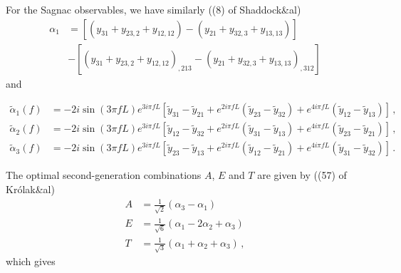\documentclass[aps,showpacs,twocolumn,prd,superscriptaddress,nofootinbib]{revtex4}
\newcommand{\nn}{\nonumber}
\begin{document}
For the Sagnac observables, we have similarly ((8) of Shaddock\&al)
%
\begin{align}
	\alpha_{1} &= \left[ \left( y_{31} + y_{23,2} + y_{12,12} \right) - \left( y_{21} + y_{32,3} + y_{13,13} \right) \right] \nn\\
	& - \left[ \left( y_{31} + y_{23,2} + y_{12,12} \right)_{,213} - \left( y_{21} + y_{32,3} + y_{13,13} \right)_{,312} \right]
\end{align}
%
and
%
\begin{widetext}
\begin{align}
	\tilde{\alpha}_{1}(f) &= - 2i \sin\left(3\pi f L\right) e^{3 i \pi f L} \left[ \tilde{y}_{31} - \tilde{y}_{21} + e^{2i\pi f L} \left( \tilde{y}_{23} - \tilde{y}_{32} \right) + e^{4i\pi f L} \left( \tilde{y}_{12} - \tilde{y}_{13} \right) \right] \,, \nn\\
	\tilde{\alpha}_{2}(f) &= - 2i \sin\left(3\pi f L\right) e^{3 i \pi f L} \left[ \tilde{y}_{12} - \tilde{y}_{32} + e^{2i\pi f L} \left( \tilde{y}_{31} - \tilde{y}_{13} \right) + e^{4i\pi f L} \left( \tilde{y}_{23} - \tilde{y}_{21} \right) \right] \,, \nn\\
	\tilde{\alpha}_{3}(f) &= - 2i \sin\left(3\pi f L\right) e^{3 i \pi f L} \left[ \tilde{y}_{23} - \tilde{y}_{13} + e^{2i\pi f L} \left( \tilde{y}_{12} - \tilde{y}_{21} \right) + e^{4i\pi f L} \left( \tilde{y}_{31} - \tilde{y}_{32} \right) \right] \,.
\end{align}
\end{widetext}
%
The optimal second-generation combinations $A$, $E$ and $T$ are given by ((57) of Kr\'olak\&al)
%
\begin{align}
	A &= \frac{1}{\sqrt{2}} \left( \alpha_{3} - \alpha_{1} \right) \nn\\
	E &= \frac{1}{\sqrt{6}} \left( \alpha_{1} - 2\alpha_{2} + \alpha_{3} \right) \nn\\
	T &= \frac{1}{\sqrt{3}} \left( \alpha_{1} + \alpha_{2} + \alpha_{3} \right) \,,
\end{align}
%
which gives
%
\end{document}
